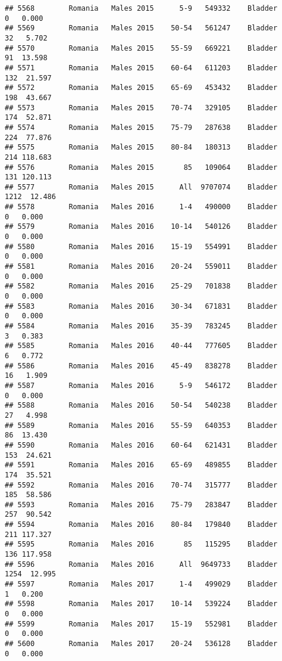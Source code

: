 \documentclass[
]{article}
\begin{document}
\begin{verbatim}
## 5568        Romania   Males 2015      5-9   549332    Bladder      0   0.000
## 5569        Romania   Males 2015    50-54   561247    Bladder     32   5.702
## 5570        Romania   Males 2015    55-59   669221    Bladder     91  13.598
## 5571        Romania   Males 2015    60-64   611203    Bladder    132  21.597
## 5572        Romania   Males 2015    65-69   453432    Bladder    198  43.667
## 5573        Romania   Males 2015    70-74   329105    Bladder    174  52.871
## 5574        Romania   Males 2015    75-79   287638    Bladder    224  77.876
## 5575        Romania   Males 2015    80-84   180313    Bladder    214 118.683
## 5576        Romania   Males 2015       85   109064    Bladder    131 120.113
## 5577        Romania   Males 2015      All  9707074    Bladder   1212  12.486
## 5578        Romania   Males 2016      1-4   490000    Bladder      0   0.000
## 5579        Romania   Males 2016    10-14   540126    Bladder      0   0.000
## 5580        Romania   Males 2016    15-19   554991    Bladder      0   0.000
## 5581        Romania   Males 2016    20-24   559011    Bladder      0   0.000
## 5582        Romania   Males 2016    25-29   701838    Bladder      0   0.000
## 5583        Romania   Males 2016    30-34   671831    Bladder      0   0.000
## 5584        Romania   Males 2016    35-39   783245    Bladder      3   0.383
## 5585        Romania   Males 2016    40-44   777605    Bladder      6   0.772
## 5586        Romania   Males 2016    45-49   838278    Bladder     16   1.909
## 5587        Romania   Males 2016      5-9   546172    Bladder      0   0.000
## 5588        Romania   Males 2016    50-54   540238    Bladder     27   4.998
## 5589        Romania   Males 2016    55-59   640353    Bladder     86  13.430
## 5590        Romania   Males 2016    60-64   621431    Bladder    153  24.621
## 5591        Romania   Males 2016    65-69   489855    Bladder    174  35.521
## 5592        Romania   Males 2016    70-74   315777    Bladder    185  58.586
## 5593        Romania   Males 2016    75-79   283847    Bladder    257  90.542
## 5594        Romania   Males 2016    80-84   179840    Bladder    211 117.327
## 5595        Romania   Males 2016       85   115295    Bladder    136 117.958
## 5596        Romania   Males 2016      All  9649733    Bladder   1254  12.995
## 5597        Romania   Males 2017      1-4   499029    Bladder      1   0.200
## 5598        Romania   Males 2017    10-14   539224    Bladder      0   0.000
## 5599        Romania   Males 2017    15-19   552981    Bladder      0   0.000
## 5600        Romania   Males 2017    20-24   536128    Bladder      0   0.000

\end{verbatim}
\end{document}
